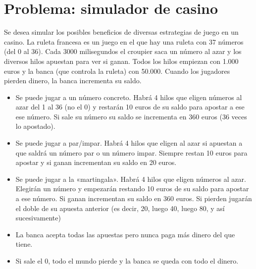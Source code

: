 \documentclass[letterpaper,10pt,spanish]{sphinxmanual}
\begin{document}
\section{Problema: simulador de casino}
\label{\detokenize{textos/tema2:problema-simulador-de-casino}}
Se desea simular los posibles beneficios de diversas estrategias de juego en un casino. La ruleta francesa es un juego en el que hay una ruleta con 37 números (del 0 al 36). Cada 3000 milisegundos el croupier saca un número al azar y los diversos hilos apuestan para ver si ganan. Todos los hilos empiezan con 1.000 euros y la banca (que controla la ruleta) con 50.000. Cuando los jugadores pierden dinero, la banca incrementa su saldo.
\begin{itemize}
\item {} 
Se puede jugar a un número concreto. Habrá 4 hilos que eligen números al azar del 1 al 36 (no el 0) y restarán 10 euros de su saldo para apostar a ese ese número. Si sale su número su saldo se incrementa en 360 euros (36 veces lo apostado).

\item {} 
Se puede jugar a par/impar. Habrá 4 hilos que eligen al azar si apuestan a que saldrá un número par o un número impar. Siempre restan 10 euros para apostar y si ganan incrementan su saldo en 20 euros.

\item {} 
Se puede jugar a la «martingala». Habrá 4 hilos que eligen números al azar. Elegirán un número y empezarán restando 10 euros de su saldo para apostar a ese número. Si ganan incrementan su saldo en 360 euros. Si pierden jugarán el doble de su apuesta anterior (es decir, 20, luego 40, luego 80, y así sucesivamente)

\item {} 
La banca acepta todas las apuestas pero nunca paga más dinero del que tiene.

\item {} 
Si sale el 0, todo el mundo pierde y la banca se queda con todo el dinero.

\end{itemize}
\end{document}
